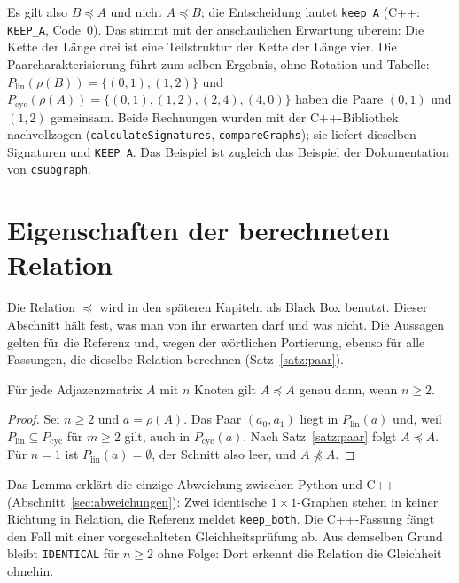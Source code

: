 Es gilt also $B\preceq A$ und nicht $A\preceq B$; die Entscheidung lautet \texttt{keep\_A} (C++: \texttt{KEEP\_A}, Code~$0$). Das stimmt mit der anschaulichen Erwartung überein: Die Kette der Länge drei ist eine Teilstruktur der Kette der Länge vier. Die Paarcharakterisierung führt zum selben Ergebnis, ohne Rotation und Tabelle: $P_{\mathrm{lin}}(\rho(B))=\{(0,1),(1,2)\}$ und $P_{\mathrm{cyc}}(\rho(A))=\{(0,1),(1,2),(2,4),(4,0)\}$ haben die Paare $(0,1)$ und $(1,2)$ gemeinsam. Beide Rechnungen wurden mit der C++-Bibliothek nachvollzogen (\texttt{calculateSignatures}, \texttt{compareGraphs}); sie liefert dieselben Signaturen und \texttt{KEEP\_A}. Das Beispiel ist zugleich das Beispiel der Dokumentation von \texttt{csubgraph}.

\section{Eigenschaften der berechneten Relation}
\label{sec:py_eigenschaften}

Die Relation $\preceq$ wird in den späteren Kapiteln als Black Box benutzt. Dieser Abschnitt hält fest, was man von ihr erwarten darf und was nicht. Die Aussagen gelten für die Referenz und, wegen der wörtlichen Portierung, ebenso für alle Fassungen, die dieselbe Relation berechnen (Satz~\ref{satz:paar}).

\begin{lemma}
	\label{lem:reflexiv}
	Für jede Adjazenzmatrix $A$ mit $n$ Knoten gilt $A\preceq A$ genau dann, wenn $n\ge 2$.
\end{lemma}

\begin{proof}
	Sei $n\ge2$ und $a=\rho(A)$. Das Paar $(a_0,a_1)$ liegt in $P_{\mathrm{lin}}(a)$ und, weil $P_{\mathrm{lin}}\subseteq P_{\mathrm{cyc}}$ für $m\ge 2$ gilt, auch in $P_{\mathrm{cyc}}(a)$. Nach Satz~\ref{satz:paar} folgt $A\preceq A$. Für $n=1$ ist $P_{\mathrm{lin}}(a)=\emptyset$, der Schnitt also leer, und $A\not\preceq A$.
\end{proof}

Das Lemma erklärt die einzige Abweichung zwischen Python und C++ (Abschnitt~\ref{sec:abweichungen}): Zwei identische $1\times1$-Graphen stehen in keiner Richtung in Relation, die Referenz meldet \texttt{keep\_both}. Die C++-Fassung fängt den Fall mit einer vorgeschalteten Gleichheitsprüfung ab. Aus demselben Grund bleibt \texttt{IDENTICAL} für $n\ge 2$ ohne Folge: Dort erkennt die Relation die Gleichheit ohnehin.

